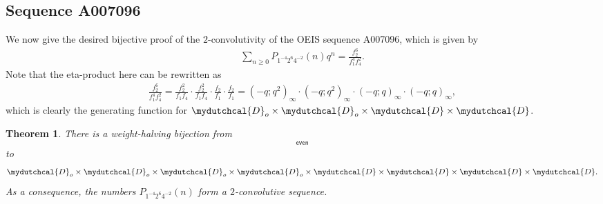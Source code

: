 \documentclass[12pt,reqno]{amsart}
\numberwithin{equation}{section}
\theoremstyle{plain}
\newtheorem{theorem}{Theorem}[section]
\theoremstyle{definition}
\theoremstyle{named}
\newcommand{\cD}{\mydutchcal{D}}
\newcommand{\even}{\mathsf{even}}
\begin{document}
\subsection{Sequence A007096}

We now give the desired bijective proof of the $2$-convolutivity of the OEIS sequence A007096, which is given by
\begin{align*}
	\sum_{n\ge 0} P_{1^{-4} 2^6 4^{-2}}(n) q^n = \frac{f_2^6}{f_1^4 f_4^2}.
\end{align*}
Note that the eta-product here can be rewritten as
\begin{align*}
	\frac{f_2^6}{f_1^4 f_4^2} = \frac{f_2^2}{f_1f_4} \cdot \frac{f_2^2}{f_1f_4} \cdot \frac{f_2}{f_1}\cdot \frac{f_2}{f_1} = (-q;q^2)_\infty\cdot  (-q;q^2)_\infty\cdot  (-q;q)_\infty\cdot  (-q;q)_\infty,
\end{align*}
which is clearly the generating function for $\cD_{o} \times \cD_{o} \times \cD \times \cD$.

\begin{theorem}\label{thm:A007096}
	There is a weight-halving bijection from
	\begin{align*}
		[\cD_{o} \times \cD_{o} \times \cD \times \cD]_\even
	\end{align*}
	to
	\begin{align*}
		\cD_{o} \times \cD_{o} \times \cD_{o} \times \cD_{o} \times \cD \times \cD \times \cD \times \cD.
	\end{align*}
	As a consequence, the numbers $P_{1^{-4} 2^6 4^{-2}}(n)$ form a $2$-convolutive sequence.
\end{theorem}
\end{document}
